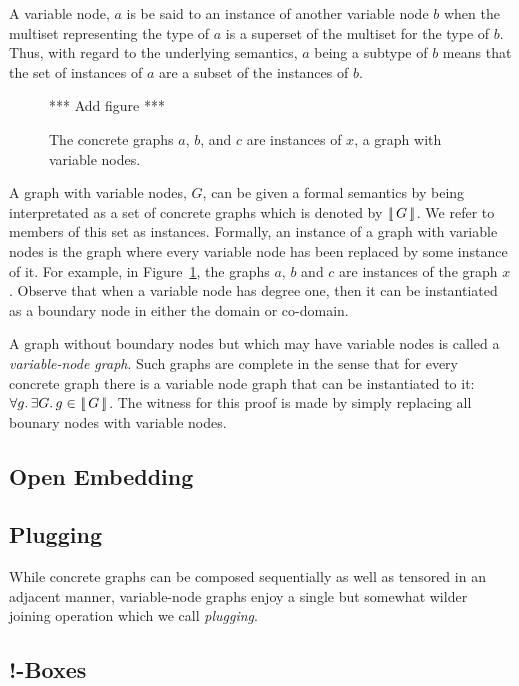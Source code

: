 \documentclass[runningheads]{llncs}
\newcommand{\vinterp}[1]{\lfloor\hspace{-0.27em}|\, #1\, |\hspace{-0.27em}\rfloor}
\begin{document}
A variable node, $a$ is be said to an instance of another variable
node $b$ when the multiset representing the type of $a$ is a superset
of the multiset for the type of $b$. Thus, with regard to the
underlying semantics, $a$ being a subtype of $b$ means that the set of
instances of $a$ are a subset of the instances of $b$.

\begin{figure}[t]
*** Add figure *** 
\label{node-variable-instances-fig}\caption{The concrete graphs $a$,
  $b$, and $c$ are instances of $x$, a graph with variable nodes.}
\end{figure}

A graph with variable nodes, $G$, can be given a formal semantics by
being interpretated as a set of concrete graphs which is denoted by
$\vinterp{G}$. We refer to members of this set as
instances. Formally, an instance of a graph with variable nodes is the
graph where every variable node has been replaced by some instance of
it. For example, in Figure~\ref{node-variable-instances-fig}, the
graphs $a$, $b$ and $c$ are instances of the graph $x$. Observe that
when a variable node has degree one, then it can be instantiated as a
boundary node in either the domain or co-domain.

A graph without boundary nodes but which may have variable nodes is
called a \emph{variable-node graph}. Such graphs are complete in the
sense that for every concrete graph there is a variable node graph
that can be instantiated to it: $\forall g.\,\exists G.\,g \in
\vinterp{G}$. The witness for this proof is made by simply replacing
all bounary nodes with variable nodes.


\subsection{Open Embedding}



\subsection{Plugging}

While concrete graphs can be composed sequentially as well as tensored
in an adjacent manner, variable-node graphs enjoy a single but
somewhat wilder joining operation which we call \emph{plugging}. 

\subsection{!-Boxes}
\end{document}
